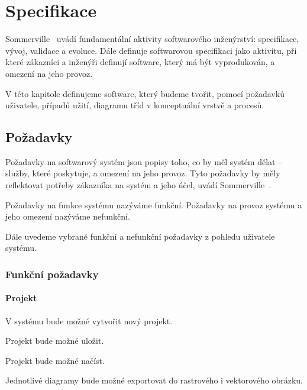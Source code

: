 \chapter{Specifikace}

Sommerville~\cite{sommerville_software_2011} %
uvádí fundamentální aktivity softwarového inženýrství: specifikace, vývoj, validace a evoluce.
Dále definuje softwarovou specifikaci jako aktivitu, při které zákazníci a inženýři definují software, který má být vyprodukován, a omezení na jeho provoz. %

V této kapitole definujeme software, který budeme tvořit, pomocí požadavků uživatele, případů užití, diagramu tříd v konceptuální vrstvě a procesů.

\section{Požadavky}

Požadavky na softwarový systém jsou popisy toho, co by měl systém dělat -- služby, které poskytuje, a omezení na jeho provoz.
Tyto požadavky by měly reflektovat potřeby zákazníka na systém a jeho účel, uvádí Sommerville~\cite[s.~83]{sommerville_software_2011}. %

Požadavky na funkce systému nazýváme funkční.
Požadavky na provoz systému a jeho omezení nazýváme nefunkční.

Dále uvedeme vybrané funkční a nefunkční požadavky z pohledu uživatele systému.

\subsection{Funkční požadavky}

\subsubsection*{Projekt}

\begin{enumfp}
    \item V systému bude možné vytvořit nový projekt.
    \item Projekt bude možné uložit.
    \item Projekt bude možné načíst.
    \item Jednotlivé diagramy bude možné exportovat do rastrového i vektorového obrázku.
\end{enumfp}

